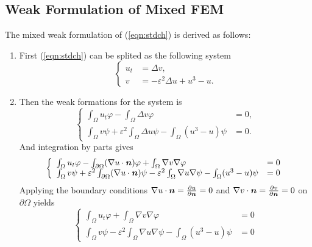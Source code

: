 \documentclass[cmbright]{mymmaauth}
\def\bvec#1{\ensuremath{\mathchoice
                     {\mbox{\boldmath$\displaystyle\mathbf{#1}$}}
                     {\mbox{\boldmath$\textstyle\mathbf{#1}$}}
                     {\mbox{\boldmath$\scriptstyle\mathbf{#1}$}}
                     {\mbox{\boldmath$\scriptscriptstyle\mathbf{#1}$}}}}
\def\bvec#1{\ensuremath{\mathchoice
                     {\mbox{\boldmath$\displaystyle#1$}}
                     {\mbox{\boldmath$\textstyle#1$}}
                     {\mbox{\boldmath$\scriptstyle#1$}}
                     {\mbox{\boldmath$\scriptscriptstyle#1$}}}}
\begin{document}
\subsection{Weak Formulation of Mixed FEM}
The mixed weak formulation of (\ref{eqn:stdch}) is derived as follows:
\begin{enumerate}
\item First (\ref{eqn:stdch}) can be splited as the following system
\begin{equation} \left\{ \begin{array}{ll}
u_t & = \Delta v, \\
v & = -\varepsilon^2 \Delta u + u^3 - u.
\end{array} \right. \end{equation} 
\item Then the weak formations for the system is 
\begin{equation} \left\{ \begin{array}{ll}
\int_\Omega u_t \varphi - \int_\Omega \Delta v \varphi & = 0 ,\\
\int_\Omega v \psi + \varepsilon^2 \int_\Omega \Delta u \psi - \int_\Omega(u^3 - u) \psi & = 0.
\end{array} \right. 
\end{equation}
And integration by parts gives 
\begin{equation} \left\{ \begin{array}{ll}
\int_\Omega u_t \varphi - \int_{\partial\Omega} (\nabla u \cdot \bvec{n})\varphi + \int_\Omega \nabla v \nabla \varphi & = 0 \\
\int_\Omega v \psi + \varepsilon^2 \int_{\partial\Omega}(\nabla u \cdot \bvec{n})\psi - \varepsilon^2 \int_\Omega \nabla u \nabla \psi - \int_\Omega(u^3 - u) \psi & = 0
\end{array} \right. 
\end{equation}
Applying the boundary conditions
$\nabla u \cdot \bvec{n} = \frac{\partial u}{\partial \bvec{n}} = 0$
and 
$\nabla v \cdot \bvec{n} = \frac{\partial v}{\partial \bvec{n}} = 0$
on $\partial\Omega$ yields 
\begin{equation} \left\{ \begin{array}{ll}
\int_\Omega u_t \varphi + \int_\Omega \nabla v \nabla \varphi & = 0 \\
\int_\Omega v \psi - \varepsilon^2 \int_\Omega \nabla u \nabla \psi - \int_\Omega(u^3 - u) \psi & = 0
\end{array} \right. 
\end{equation}
\end{enumerate}
\end{document}
